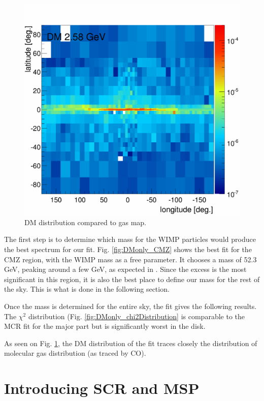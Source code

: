 \begin{figure}
  \centering
  \includegraphics[width=.9\linewidth]{pic/results/DMonly_DM_fluxE12_skymap.png}
  \caption{DM distribution compared to gas map.}
  \label{fig:DMonly_skymap_DM}
\end{figure}


The first step is to determine which mass for the WIMP particles would produce the best spectrum for our fit. Fig. \ref{fig:DMonly_CMZ} shows the best fit for the CMZ region, with the WIMP mass as a free parameter. It chooses a mass of 52.3 GeV, peaking around a few GeV, as expected in . Since the excess is the most significant in this region, it is also the best place to define our mass for the rest of the sky. This is what is done in the following section.


Once the mass is determined for the entire sky, the fit gives the following results. The $\chi^2$ distribution (Fig. \ref{fig:DMonly_chi2Distribution} is comparable to the MCR fit for the major part but is significantly worst in the disk.


As seen on Fig. \ref{fig:DMonly_skymap_DM}, the DM distribution of the fit traces closely the distribution of molecular gas distribution (as traced by CO).



\section{Introducing SCR and MSP}

